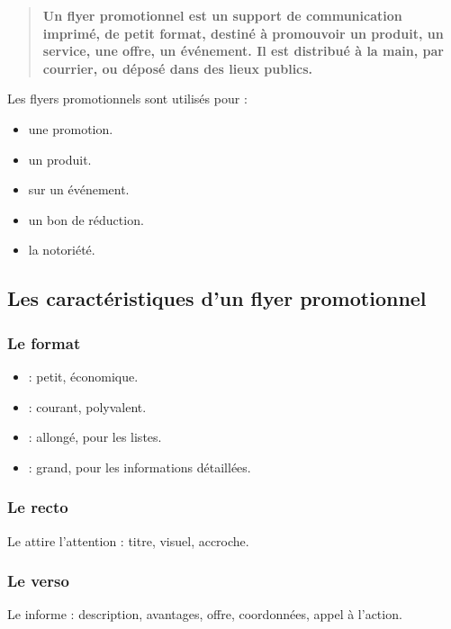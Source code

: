 \begin{quote}
\textbf{Un flyer promotionnel est un support de communication imprimé, de petit format, destiné à promouvoir un produit, un service, une offre, un événement. Il est distribué à la main, par courrier, ou déposé dans des lieux publics.}
\end{quote}

Les flyers promotionnels sont utilisés pour :

\begin{itemize}
    \item {} une promotion.
    \item {} un produit.
    \item {} sur un événement.
    \item {} un bon de réduction.
    \item {} la notoriété.
\end{itemize}

\subsection{Les caractéristiques d'un flyer promotionnel}

\subsubsection{Le format}

\begin{itemize}
    \item {} : petit, économique.
    \item {} : courant, polyvalent.
    \item {} : allongé, pour les listes.
    \item {} : grand, pour les informations détaillées.
\end{itemize}

\subsubsection{Le recto}

Le  attire l'attention : titre, visuel, accroche.

\subsubsection{Le verso}

Le  informe : description, avantages, offre, coordonnées, appel à l'action.

